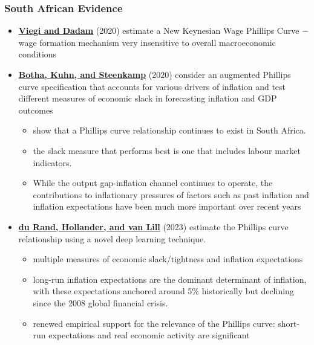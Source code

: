 \documentclass[10pt, xcolor=x11names, table]{beamer}
\begin{document}
\begin{frame}
\frametitle{South African Evidence}
\begin{itemize}
\item \href{https://www.resbank.co.za/content/dam/sarb/publications/working-papers/2020/WP\%202013.pdf}{\textbf{Viegi and Dadam}} (2020) estimate a New Keynesian Wage Phillips Curve $-$ wage formation mechanism very insensitive to overall macroeconomic conditions
\item  \href{https://ideas.repec.org/p/rbz/wpaper/10211.html}{\textbf{Botha, Kuhn, and Steenkamp}} (2020) consider an augmented Phillips curve specification that accounts for various drivers of inflation and test different measures of economic slack in forecasting inflation and GDP outcomes
\begin{itemize}
\item show that a Phillips curve relationship continues to exist in South Africa.
\item the slack measure that performs best is one that includes labour market indicators.
\item While the output gap-inflation channel continues to operate, the contributions to inflationary pressures of factors such as past inflation and inflation expectations have been much more important over recent years
\end{itemize}
\item \href{https://ideas.repec.org/p/unu/wpaper/wp-2023-79.html}{\textbf{du Rand, Hollander, and van Lill}} (2023) estimate the Phillips curve relationship using a novel deep learning technique.
\begin{itemize}
\item multiple measures of economic slack/tightness and inflation expectations
\item long-run inflation expectations are the dominant determinant of inflation, with these expectations anchored around 5\% historically but declining since the 2008 global financial crisis.
\item renewed empirical support for the relevance of the Phillips curve: short-run expectations and real economic activity are significant 
\end{itemize}
\end{itemize}
\end{frame}	
\end{document}
